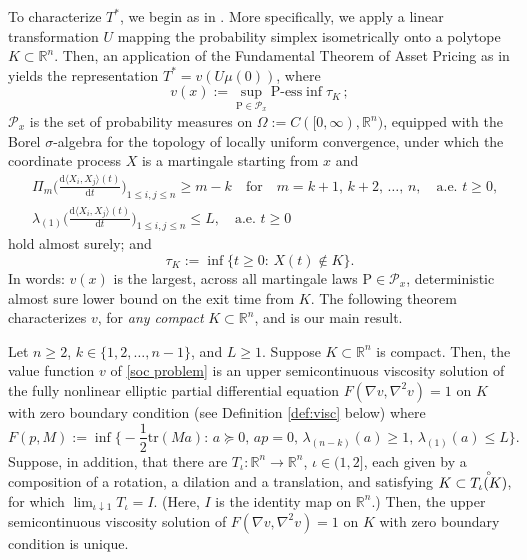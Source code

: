 \documentclass[11pt]{amsart}
\numberwithin{equation}{section}
\newcommand{\rr}{\mathbb{R}}
\begin{document}
\medskip

To characterize $T^*$, we begin as in \cite[Section 5]{larsson_relative_2021}. More specifically, we apply a linear transformation $U$ mapping the probability simplex isometrically onto a polytope $K\subset\rr^n$. Then, an application of the Fundamental Theorem of Asset Pricing as in \cite[proof of Theorem 3.1]{larsson_relative_2021} yields the representation $T^*=v(U\mu(0))$, where  
\begin{equation}\label{soc problem}
v(x) := \sup_{\mathrm{P} \in \mathcal{P}_x} \mathrm{P}\text{-ess} \inf \tau_K\,;
\end{equation}
$\mathcal{P}_x$ is the set of probability measures on $\Omega:=C([0,\infty),\mathbb{R}^n)$, equipped with the Borel $\sigma$-algebra for the topology of locally uniform convergence, under which the coordinate process $X$ is a martingale starting from $x$ and
\begin{equation}\label{eq: constraint}
\begin{split}
& \Pi_m\bigg(\frac{\mathrm{d}\langle X_i,X_j\rangle(t)}{\mathrm{d}t}\bigg)_{1\le i,j\le n}\geq m-k \quad\text{for}\quad m = k+1,\, k+2,\,\ldots,\, n,\quad \text{a.e. }t\ge0, \\
& \lambda_{(1)}\bigg(\frac{\mathrm{d}\langle X_i,X_j\rangle(t)}{\mathrm{d}t}\bigg)_{1\le i,j\le n}\le L,\quad \text{a.e. } t\ge0
\end{split}
\end{equation}
hold almost surely; and 
\begin{equation}
\tau_K := \inf\big\{t \geq 0:\, X(t) \notin K\big\}.
\end{equation}
In words: $v(x)$ is the largest, across all martingale laws $\mathrm{P} \in \mathcal{P}_x$, deterministic almost sure lower bound on the exit time from $K$. The following theorem characterizes $v$, for \textit{any compact} $K\subset\mathbb{R}^n$, and is our main result.  

\begin{thm} \label{thm: vis}
Let $n\geq 2$, $k\in\{1,2,\ldots,n-1\}$, and $L\ge1$. Suppose $K\subset \mathbb{R}^n$ is compact. Then, the value function $v$ of \eqref{soc problem} is an upper semicontinuous viscosity solution of the fully nonlinear elliptic partial differential equation 
$F(\nabla v,\nabla^2 v)=1$ on $K$ with zero boundary condition (see Definition \ref{def:visc} below) where
\begin{equation} \label{def: F}
F(p, M):=\inf\bigg\{\!-\frac{1}{2}\mathrm{tr}(Ma):\, a\succeq 0,\, a p = 0,\,  \lambda_{(n-k)}(a)\geq 1,\, \lambda_{(1)}(a)\leq L\bigg\}.
\end{equation}
Suppose, in addition, that there are $T_\iota\!:\rr^n\to\rr^n$, $\iota\in(1,2]$, each given by a composition of a rotation, a dilation and a translation, and satisfying $K\subset \accentset{\circ}{T_\iota(K)}$, for which $\lim_{\iota\downarrow1} T_\iota=I$. (Here, $I$ is the identity map on $\rr^n$.) Then, the upper semicontinuous viscosity solution of $F(\nabla v,\nabla^2 v)=1$ on $K$ with zero boundary condition is unique.
\end{thm}
\end{document}

